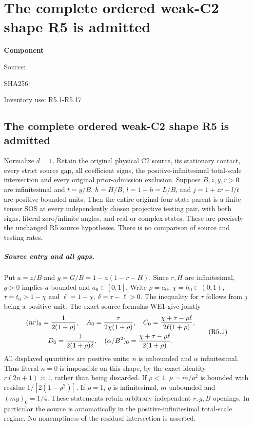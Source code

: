 \chapter{The complete ordered weak-C2 shape R5 is admitted}
\label{component:p8da9ea6ed9e5}
\noindent\textbf{Component }\par
{\small\noindent Source: \par}
{\small\noindent SHA256: \par}
{\small\noindent Inventory use: R5.1-R5.17\par}
\medskip
\section{The complete ordered weak-C2 shape R5 is admitted}
\label{p8da9ea6ed9e5:sec:r17-r5}

\begin{theorem}
Normalize $d=1$. Retain the original physical C2 source, its stationary contact, every strict
source gap, all coefficient signs, the positive-infinitesimal total-scale
intersection and every original prior-admission exclusion. Suppose
$B,z,y,r>0$ are infinitesimal and $t=y/B$, $h=H/B$, $l=1-h=L/B$,
and $j=1+zr-l/t$ are positive bounded units. Then the entire original
four-state parent is a finite tensor SOS at every independently chosen
projective testing pair, with both signs, literal zero/infinite angles,
and real or complex states. These are precisely the unchanged R5 source
hypotheses. There is no comparison of source and testing rates.
\end{theorem}

\paragraph{Source entry and all gaps.}
Put $a=z/B$ and $g=G/B=1-a(1-r-H)$. Since $r,H$ are infinitesimal,
$g>0$ implies $a$ bounded and $a_0\in[0,1]$. Write $\rho=a_0$,
$\chi=h_0\in(0,1)$, $\tau=t_0>1-\chi$ and $\ell=1-\chi$,
$\delta=\tau-\ell>0$. The inequality for $\tau$ follows from $j$
being a positive unit. The exact source formulas WE1 give jointly
\[
\begin{gathered}
 (nr)_0={1\over2(1+\rho)},\quad
 A_0={\tau\over2\chi(1+\rho)},\quad
 C_0={\chi+\tau-\rho\ell\over2\ell(1+\rho)},\\
 D_0={1\over2(1+\rho)\delta},\quad
 (\alpha/B^2)_0={\chi+\tau-\rho\ell\over2(1+\rho)}.
\end{gathered}       \tag{R5.1}
\]
All displayed quantities are positive units; $n$ is unbounded and
$\alpha$ infinitesimal. Thus literal $n=0$ is impossible on this shape,
by the exact identity $r(2n+1)\asymp1$, rather than being discarded.
If $\rho<1$, $\mu=m/a^2$ is bounded with residue
$1/[2(1-\rho^2)]$. If $\rho=1$, $g$ is infinitesimal,
$m$ unbounded and $(mg)_0=1/4$. These statements retain arbitrary
independent $r,g,B$ openings. In particular the source is automatically
in the positive-infinitesimal total-scale regime. No nonemptiness of
the residual intersection is asserted.

